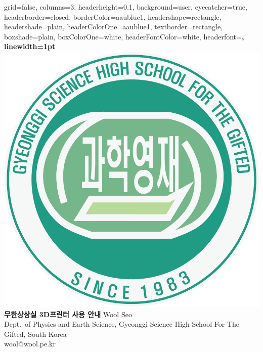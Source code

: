 \documentclass[a0paper,portrait]{baposter}
\begin{document}
\begin{poster}{
  grid=false,
  columns=3,
  headerheight=0.1\textheight,
  background=user,
  eyecatcher=true,
  headerborder=closed,
  borderColor=aaublue1,
  headershape=rectangle,
  headershade=plain,
  headerColorOne=aaublue1,
  textborder=rectangle,
  boxshade=plain,
  boxColorOne=white,
  headerFontColor=white,
  headerfont=\Large\sf\bf,
  linewidth=1pt
}
{
  \includegraphics[height=0.75\headerheight]{./logo/gshslogo_green.png}
}
{\color{white}\bf
  무한상상실 3D프린터 사용 안내
}
{\color{white}\small
  \vspace{1em} Wool Seo\\[0.5em]
  Dept.\ of Physics and Earth Science, Gyeonggi Science High School For The Gifted, South Korea\\
  wool@wool.pe.kr
}
{
}
\end{poster}
\end{document}
